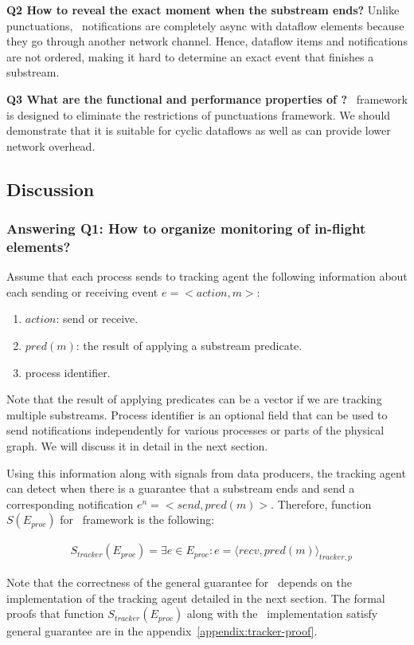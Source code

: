 {\bf Q2 How to reveal the exact moment when the substream ends?} Unlike punctuations, \tracker\ notifications are completely async with dataflow elements because they go through another network channel. Hence, dataflow items and notifications are not ordered, making it hard to determine an exact event that finishes a substream.

{\bf Q3 What are the functional and performance properties of \tracker?} \tracker\ framework is designed to eliminate the restrictions of punctuations framework. We should demonstrate that it is suitable for cyclic dataflows as well as can provide lower network overhead.

\subsection{Discussion}

\subsubsection{Answering Q1: How to organize monitoring of in-flight elements?}
Assume that each process sends to tracking agent the following information about each sending or receiving event $e = <action,m>$:
\begin{enumerate}
    \item $action$: send or receive.
    \item $pred(m)$: the result of applying a substream predicate.
    \item process identifier.
\end{enumerate}

Note that the result of applying predicates can be a vector if we are tracking multiple substreams. Process identifier is an optional field that can be used to send notifications independently for various processes or parts of the physical graph. We will discuss it in detail in the next section.

Using this information along with signals from data producers, the tracking agent can detect when there is a guarantee that a substream ends and send a corresponding notification $e^{n} = <send,pred(m)>$. Therefore, function $S(E_{proc})$ for \tracker\ framework is the following:

\begin{align*}
& S_{tracker}(E_{proc}) = \exists e \in E_{proc} : e = \langle recv,pred(m)\rangle_{tracker,p}
\end{align*}

Note that the correctness of the general guarantee for \tracker\ depends on the implementation of the tracking agent detailed in the next section. The formal proofs that function $S_{tracker}(E_{proc})$ along with the \tracker\ implementation satisfy general guarantee are in the appendix~\ref{appendix:tracker-proof}.

